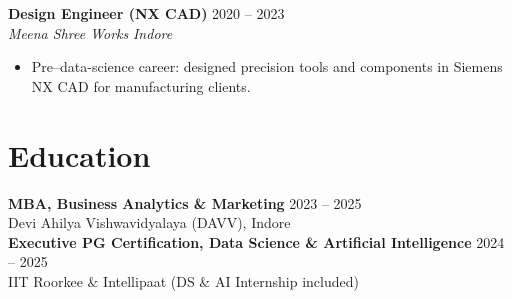 \documentclass[11pt,a4paper]{article}
\newcommand{\resumeSubheading}[4]{
  \textbf{#1} \hfill #2 \\
  \textit{#3} \hfill \textit{#4}
}
\begin{document}
\resumeSubheading{Design Engineer (NX CAD)}{2020 -- 2023}{Meena Shree Works}{Indore}
\begin{itemize}
    \item Pre--data-science career: designed precision tools and components in Siemens NX CAD for manufacturing clients.
\end{itemize}

\section*{Education}
\textbf{MBA, Business Analytics \& Marketing} \hfill 2023 -- 2025 \\
Devi Ahilya Vishwavidyalaya (DAVV), Indore \\[2pt]
\textbf{Executive PG Certification, Data Science \& Artificial Intelligence} \hfill 2024 -- 2025 \\
IIT Roorkee \& Intellipaat (DS \& AI Internship included)
\end{document}
